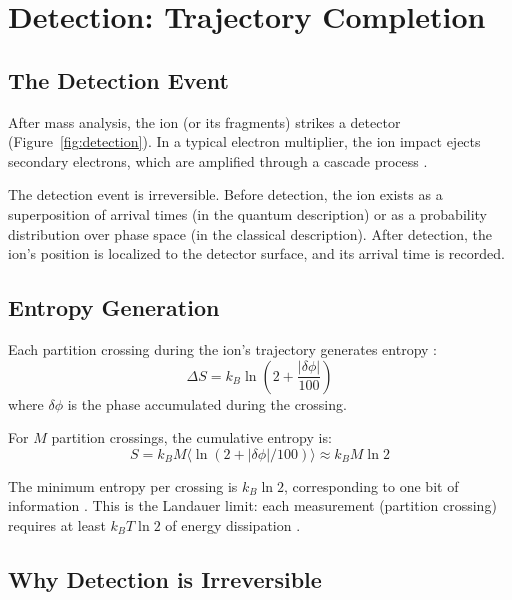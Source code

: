 \documentclass[twocolumn,10pt]{article}
\theoremstyle{remark}
\begin{document}
\section{Detection: Trajectory Completion}
\label{sec:detection}

\subsection{The Detection Event}

After mass analysis, the ion (or its fragments) strikes a detector (Figure~\ref{fig:detection}). In a typical electron multiplier, the ion impact ejects secondary electrons, which are amplified through a cascade process \cite{daly1960scintillation,dietz1965basic}.

The detection event is irreversible. Before detection, the ion exists as a superposition of arrival times (in the quantum description) or as a probability distribution over phase space (in the classical description). After detection, the ion's position is localized to the detector surface, and its arrival time is recorded.

\subsection{Entropy Generation}

Each partition crossing during the ion's trajectory generates entropy \cite{boltzmann1877beziehung}:
\begin{equation}
\Delta S = k_B \ln\left(2 + \frac{|\delta\phi|}{100}\right)
\end{equation}
where $\delta\phi$ is the phase accumulated during the crossing.

For $M$ partition crossings, the cumulative entropy is:
\begin{equation}
S = k_B M \langle \ln(2 + |\delta\phi|/100) \rangle \approx k_B M \ln 2
\end{equation}

The minimum entropy per crossing is $k_B \ln 2$, corresponding to one bit of information \cite{shannon1948mathematical}. This is the Landauer limit: each measurement (partition crossing) requires at least $k_B T \ln 2$ of energy dissipation \cite{landauer1961irreversibility,bennett1982thermodynamics}.

\subsection{Why Detection is Irreversible}
\end{document}
